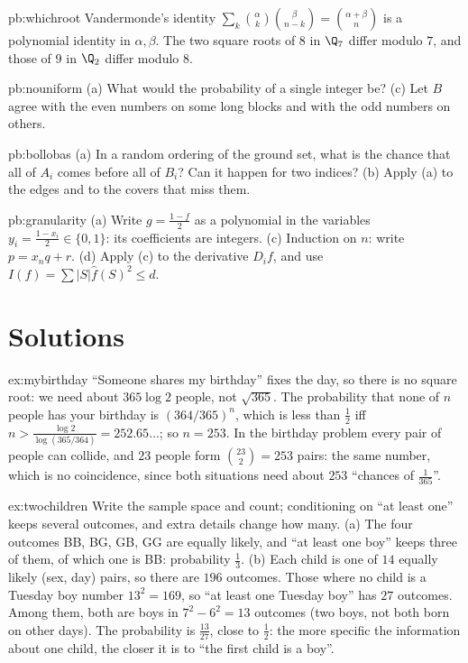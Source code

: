 \begin{hint}{pb:whichroot}
Vandermonde's identity $\sum_k\binom\alpha k\binom\beta{n-k}=\binom{\alpha+\beta}n$ is a polynomial identity in $\alpha,\beta$.
The two square roots of $8$ in $\Q_7$ differ modulo $7$, and those of $9$ in $\Q_2$ differ modulo $8$.
\end{hint}

\begin{hint}{pb:nouniform}
(a) What would the probability of a single integer be? (c) Let $B$ agree with the even numbers on some long blocks and with the
odd numbers on others.
\end{hint}

\begin{hint}{pb:bollobas}
(a) In a random ordering of the ground set, what is the chance that all of $A_i$ comes before all of $B_i$? Can it happen for two
indices? (b) Apply (a) to the edges and to the covers that miss them.
\end{hint}

\begin{hint}{pb:granularity}
(a) Write $g=\frac{1-f}2$ as a polynomial in the variables $y_i=\frac{1-x_i}2\in\{0,1\}$: its coefficients are integers. (c) Induction on $n$:
write $p=x_nq+r$. (d) Apply (c) to the derivative $D_if$, and use $I(f)=\sum|S|\hat f(S)^2\le d$.
\end{hint}

\section{Solutions}

\begin{solution}{ex:mybirthday}
\idea ``Someone shares my birthday'' fixes the day, so there is no square root: we need about $365\log2$ people,
not $\sqrt{365}$.
\writeup The probability that none of $n$ people has your birthday is $(364/365)^n$, which is less than $\frac12$
iff $n>\frac{\log2}{\log(365/364)}=252.65\ldots$; so $n=253$. In the birthday problem every pair of people can
collide, and $23$ people form $\binom{23}2=253$ pairs: the same number, which is no coincidence, since both
situations need about $253$ ``chances of $\frac1{365}$''.
\end{solution}

\begin{solution}{ex:twochildren}
\idea Write the sample space and count; conditioning on ``at least one'' keeps several outcomes, and extra
details change how many.
\writeup (a) The four outcomes BB, BG, GB, GG are equally likely, and ``at least one boy'' keeps three of them,
of which one is BB: probability $\frac13$.
(b) Each child is one of $14$ equally likely (sex, day) pairs, so there are $196$ outcomes. Those where no child is
a Tuesday boy number $13^2=169$, so ``at least one Tuesday boy'' has $27$ outcomes. Among them, both are boys in
$7^2-6^2=13$ outcomes (two boys, not both born on other days). The probability is $\frac{13}{27}$, close to
$\frac12$: the more specific the information about one child, the closer it is to ``the first child is a boy''.
\end{solution}

